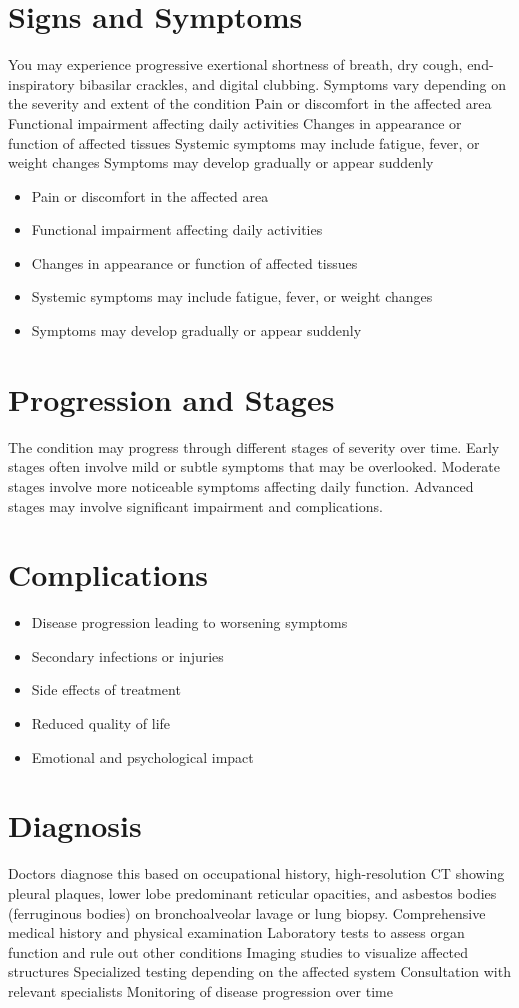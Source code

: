 \section{Signs and Symptoms}
You may experience progressive exertional shortness of breath, dry cough, end-inspiratory bibasilar crackles, and digital clubbing. Symptoms vary depending on the severity and extent of the condition Pain or discomfort in the affected area Functional impairment affecting daily activities Changes in appearance or function of affected tissues Systemic symptoms may include fatigue, fever, or weight changes Symptoms may develop gradually or appear suddenly

\begin{itemize}[noitemsep]
  \item Pain or discomfort in the affected area
  \item Functional impairment affecting daily activities
  \item Changes in appearance or function of affected tissues
  \item Systemic symptoms may include fatigue, fever, or weight changes
  \item Symptoms may develop gradually or appear suddenly
\end{itemize}
\section{Progression and Stages}
The condition may progress through different stages of severity over time. Early stages often involve mild or subtle symptoms that may be overlooked. Moderate stages involve more noticeable symptoms affecting daily function. Advanced stages may involve significant impairment and complications.
\section{Complications}
\begin{itemize}[noitemsep]
  \item Disease progression leading to worsening symptoms
  \item Secondary infections or injuries
  \item Side effects of treatment
  \item Reduced quality of life
  \item Emotional and psychological impact
\end{itemize}
\section{Diagnosis}
Doctors diagnose this based on occupational history, high-resolution CT showing pleural plaques, lower lobe predominant reticular opacities, and asbestos bodies (ferruginous bodies) on bronchoalveolar lavage or lung biopsy. Comprehensive medical history and physical examination Laboratory tests to assess organ function and rule out other conditions Imaging studies to visualize affected structures Specialized testing depending on the affected system Consultation with relevant specialists Monitoring of disease progression over time

